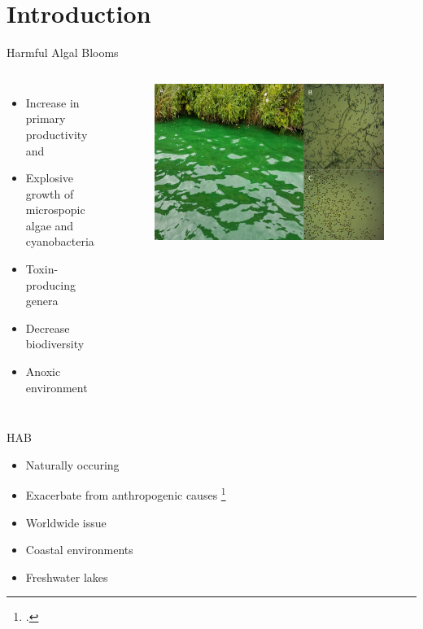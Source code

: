 \section{Introduction}

\begin{frame}{Harmful Algal Blooms}

\begin{columns}

	\begin{itemize}
		\item Increase in primary productivity and 
		\item Explosive growth of microspopic algae and cyanobacteria
		\item Toxin-producing genera
		\item Decrease biodiversity
		\item Anoxic environment
	\end{itemize}

	\begin{figure}
		\hspace*{-1cm}
		\vspace*{-1cm}
		\includegraphics[scale=0.25]{../figures/cyano.png}
	\end{figure}
\end{columns}

\end{frame}
\begin{frame}{HAB}

	\begin{itemize}
		\item Naturally occuring
		\item Exacerbate from anthropogenic causes \footcite{rastogi_cyanotoxin-microcystins:_2014}
		\item Worldwide issue
		\item Coastal environments
		\item Freshwater lakes
	\end{itemize}

\end{frame}
